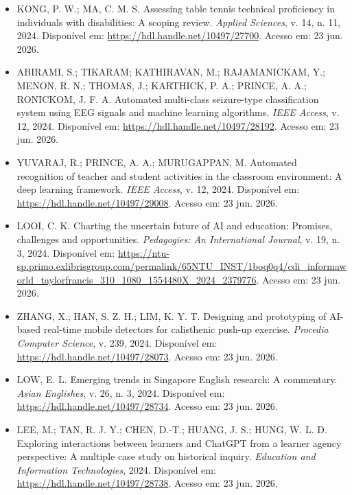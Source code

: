 \documentclass[english]{textolivre}
\begin{document}
\begin{itemize}
\item[] KONG, P. W.; MA, C. M. S. Assessing table tennis technical proficiency in individuals with disabilities: A scoping review. \textit{Applied Sciences}, v. 14, n. 11, 2024. Disponível em: \url{https://hdl.handle.net/10497/27700}. Acesso em: 23 jun. 2026.

\item[] ABIRAMI, S.; TIKARAM; KATHIRAVAN, M.; RAJAMANICKAM, Y.; MENON, R. N.; THOMAS, J.; KARTHICK, P. A.; PRINCE, A. A.; RONICKOM, J. F. A. Automated multi-class seizure-type classification system using EEG signals and machine learning algorithms. \textit{IEEE Access}, v. 12, 2024. Disponível em: \url{https://hdl.handle.net/10497/28192}. Acesso em: 23 jun. 2026.

\item[] YUVARAJ, R.; PRINCE, A. A.; MURUGAPPAN, M. Automated recognition of teacher and student activities in the classroom environment: A deep learning framework. \textit{IEEE Access}, v. 12, 2024. Disponível em: \url{https://hdl.handle.net/10497/29008}. Acesso em: 23 jun. 2026.

\item[] LOOI, C. K. Charting the uncertain future of AI and education: Promises, challenges and opportunities. \textit{Pedagogies: An International Journal}, v. 19, n. 3, 2024. Disponível em: \url{https://ntu-sp.primo.exlibrisgroup.com/permalink/65NTU_INST/1boq0q4/cdi_informaworld_taylorfrancis_310_1080_1554480X_2024_2379776}. Acesso em: 23 jun. 2026.

\item[] ZHANG, X.; HAN, S. Z. H.; LIM, K. Y. T. Designing and prototyping of AI-based real-time mobile detectors for calisthenic push-up exercise. \textit{Procedia Computer Science}, v. 239, 2024. Disponível em: \url{https://hdl.handle.net/10497/28073}. Acesso em: 23 jun. 2026.

\item[] LOW, E. L. Emerging trends in Singapore English research: A commentary. \textit{Asian Englishes}, v. 26, n. 3, 2024. Disponível em: \url{https://hdl.handle.net/10497/28734}. Acesso em: 23 jun. 2026.

\item[] LEE, M.; TAN, R. J. Y.; CHEN, D.-T.; HUANG, J. S.; HUNG, W. L. D. Exploring interactions between learners and ChatGPT from a learner agency perspective: A multiple case study on historical inquiry. \textit{Education and Information Technologies}, 2024. Disponível em: \url{https://hdl.handle.net/10497/28738}. Acesso em: 23 jun. 2026.


\end{itemize}
\end{document}
